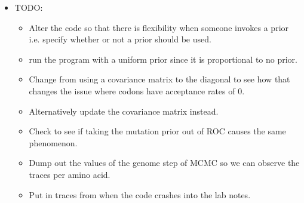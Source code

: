 \documentclass[11pt]{labbook}
\begin{document}
    \begin{itemize}
        \item TODO: 
        \begin{itemize}
            \item Alter the code so that there is flexibility when someone invokes a prior i.e. specify whether or not a prior should be used.
            \item run the program with a uniform prior since it is proportional to no prior.
            \item Change from using a covariance matrix to the diagonal to see how that changes the issue where codons have acceptance rates of 0.
            \item Alternatively update the covariance matrix instead.
            \item Check to see if taking the mutation prior out of ROC causes the same phenomenon.
            \item Dump out the values of the genome step of MCMC so we can observe the traces per amino acid.
            \item Put in traces from when the code crashes into the lab notes.
        \end{itemize}
    \end{itemize}
    
\end{document}
